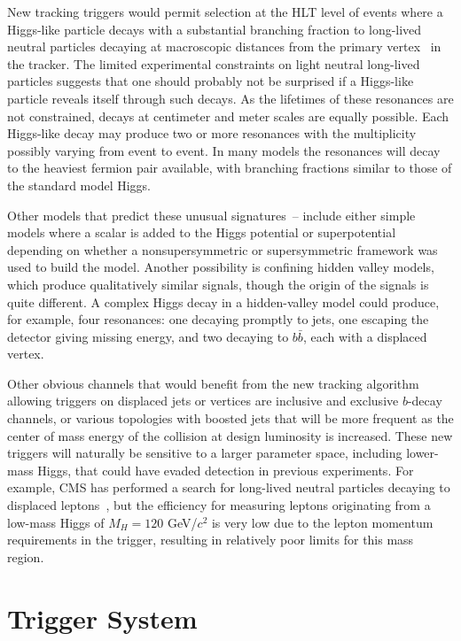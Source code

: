 \documentclass{JINST}
\begin{document}
New tracking triggers would permit selection at the HLT level of events where a Higgs-like particle decays with a substantial branching fraction to long-lived neutral particles decaying
at macroscopic distances from the primary vertex~\cite{bib:hiddenvalley} in the tracker. The limited experimental constraints on light neutral long-lived particles
suggests that one should probably not be surprised if a Higgs-like particle reveals itself  through such decays. As the lifetimes of these resonances 
are not constrained, decays at centimeter and meter scales are equally possible. Each Higgs-like decay may produce two or more resonances 
with the multiplicity possibly varying from event to event. In many models the resonances will decay to the heaviest fermion 
pair available, with branching fractions similar to those of the standard model Higgs.

Other models that predict these unusual signatures~\cite{bib:hiddenvalley}--\cite{Strassler:2006ri} include either simple models where a scalar is added to the Higgs potential or superpotential depending on whether a nonsupersymmetric
or supersymmetric framework was used to build the model. Another possibility is confining hidden valley models, which produce qualitatively similar signals, though the origin of the signals is 
quite different.  A complex Higgs decay in a hidden-valley model could produce, for example, four resonances: one decaying promptly to jets,
 one escaping the detector giving missing energy, and two decaying to $b\bar{b}$, each with a displaced vertex.  

Other obvious channels that would benefit from the new tracking algorithm allowing triggers on displaced jets
or vertices are inclusive and exclusive $b$-decay channels, or various topologies with boosted jets that will
be more frequent as the center of mass energy of the collision at design luminosity is increased. These new
triggers will naturally be sensitive to a larger parameter space, including lower-mass Higgs, that could have
evaded detection in previous experiments. For example, CMS has performed a search for long-lived neutral
particles decaying to displaced leptons~\cite{Chatrchyan:2012jna}, but the efficiency for measuring leptons
originating from a low-mass Higgs of $M_H = 120$ GeV/$c^2$ is very low due to the lepton momentum requirements
in the trigger, resulting in relatively poor limits for this mass region.

\section{Trigger System}
%
\end{document}
